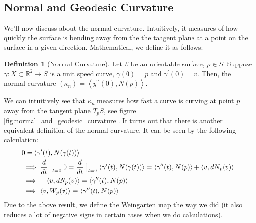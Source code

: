 \documentclass{article}
\theoremstyle{plain}
\theoremstyle{definition}
\newtheorem{definition}{Definition}
\theoremstyle{remark}
\newcommand{\R}{\mathbb{R}}
\begin{document}
\subsection{Normal and Geodesic Curvature}
We'll now discuss about the normal curvature. Intuitively, it measures of how quickly the surface is bending away from the the tangent plane at a point on the surface in a given direction. Mathematical, we define it as follows:

\begin{definition}[Normal Curvature]
    Let \(S\) be an orientable surface, \( p \in S\). Suppose \( \gamma: X \subset \R^2 \rightarrow S\) is a unit speed curve, \( \gamma(0) = p\) and \(\gamma^{\prime}(0) = v\). Then, the normal curvature \(( \kappa_n) = \left\langle y^{\prime \prime}(0), N(p)\right\rangle \).
\end{definition}
We can intuitively see that \(\kappa_n\) measures how fast a curve is curving at point \(p\) away from the tangent plane \(T_pS\), see figure \ref{fig:normal_and_geodesic_curvature}.
It turns out that there is another equivalent definition of the normal curvature. It can be seen by the following calculation:
\begin{align}
    \begin{split}
        & 0 = \left\langle \gamma^{\prime}(t) , N(\gamma(t)) \right\rangle \\
        & \implies \frac{d}{dt} \bigm|_{t=0} 0  = \frac{d}{dt} \bigm|_{t=0} \left\langle \gamma^{\prime}(t) , N(\gamma(t)) \right\rangle 
        = \left\langle \gamma^{\prime \prime}(t), N(p)\right\rangle + \left\langle v, dN_p(v) \right\rangle \\
        & \implies  - \left\langle v, dN_p(v) \right\rangle  = \left\langle \gamma^{\prime \prime}(t), N(p)\right\rangle \\
        & \implies   \left\langle v, W_p(v) \right\rangle = \left\langle \gamma^{\prime \prime}(t), N(p)\right\rangle
    \end{split}
\end{align}
Due to the above result, we define the Weingarten map the way we did (it also reduces a lot of negative signs in certain cases when we do calculations). \\
\end{document}
